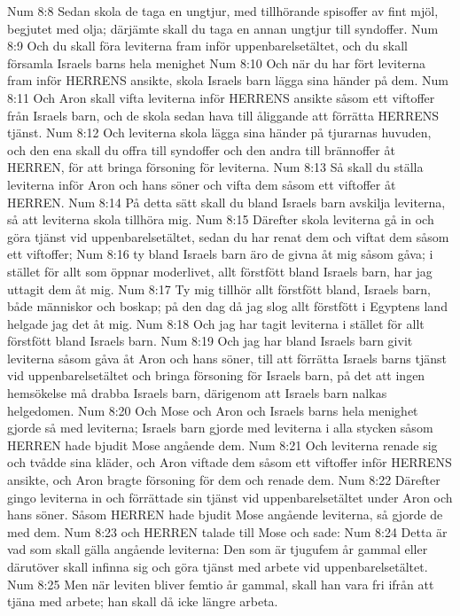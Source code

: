 Num 8:8  Sedan skola de taga en ungtjur, med tillhörande spisoffer av fint mjöl, begjutet med olja; därjämte skall du taga en annan ungtjur till syndoffer.
Num 8:9  Och du skall föra leviterna fram inför uppenbarelsetältet, och du skall församla Israels barns hela menighet
Num 8:10  Och när du har fört leviterna fram inför HERRENS ansikte, skola Israels barn lägga sina händer på dem.
Num 8:11  Och Aron skall vifta leviterna inför HERRENS ansikte såsom ett viftoffer från Israels barn, och de skola sedan hava till åliggande att förrätta HERRENS tjänst.
Num 8:12  Och leviterna skola lägga sina händer på tjurarnas huvuden, och den ena skall du offra till syndoffer och den andra till brännoffer åt HERREN, för att bringa försoning för leviterna.
Num 8:13  Så skall du ställa leviterna inför Aron och hans söner och vifta dem såsom ett viftoffer åt HERREN.
Num 8:14  På detta sätt skall du bland Israels barn avskilja leviterna, så att leviterna skola tillhöra mig.
Num 8:15  Därefter skola leviterna gå in och göra tjänst vid uppenbarelsetältet, sedan du har renat dem och viftat dem såsom ett viftoffer;
Num 8:16  ty bland Israels barn äro de givna åt mig såsom gåva; i stället för allt som öppnar moderlivet, allt förstfött bland Israels barn, har jag uttagit dem åt mig.
Num 8:17  Ty mig tillhör allt förstfött bland, Israels barn, både människor och boskap; på den dag då jag slog allt förstfött i Egyptens land helgade jag det åt mig.
Num 8:18  Och jag har tagit leviterna i stället för allt förstfött bland Israels barn.
Num 8:19  Och jag har bland Israels barn givit leviterna såsom gåva åt Aron och hans söner, till att förrätta Israels barns tjänst vid uppenbarelsetältet och bringa försoning för Israels barn, på det att ingen hemsökelse må drabba Israels barn, därigenom att Israels barn nalkas helgedomen.
Num 8:20  Och Mose och Aron och Israels barns hela menighet gjorde så med leviterna; Israels barn gjorde med leviterna i alla stycken såsom HERREN hade bjudit Mose angående dem.
Num 8:21  Och leviterna renade sig och tvådde sina kläder, och Aron viftade dem såsom ett viftoffer inför HERRENS ansikte, och Aron bragte försoning för dem och renade dem.
Num 8:22  Därefter gingo leviterna in och förrättade sin tjänst vid uppenbarelsetältet under Aron och hans söner. Såsom HERREN hade bjudit Mose angående leviterna, så gjorde de med dem.
Num 8:23  och HERREN talade till Mose och sade:
Num 8:24  Detta är vad som skall gälla angående leviterna: Den som är tjugufem år gammal eller därutöver skall infinna sig och göra tjänst med arbete vid uppenbarelsetältet.
Num 8:25  Men när leviten bliver femtio år gammal, skall han vara fri ifrån att tjäna med arbete; han skall då icke längre arbeta.
